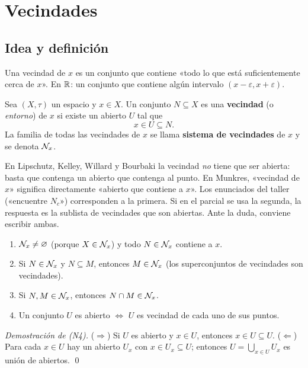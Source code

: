\section{Vecindades}
\subsection{Idea y definición}
Una vecindad de $x$ es un conjunto que contiene «todo lo que está suficientemente cerca de $x$». En $\mathbb{R}$: un conjunto
que contiene algún intervalo $(x-\varepsilon,x+\varepsilon)$.
\begin{definicion}
Sea $(X,\tau)$ un espacio y $x\in X$. Un conjunto $N\subseteq X$ es una \textbf{vecindad} (o \emph{entorno}) de $x$ si
existe un abierto $U$ tal que
\[x\in U\subseteq N.\]
La familia de todas las vecindades de $x$ se llama \textbf{sistema de vecindades} de $x$ y se denota $\mathcal{N}_x$.
\end{definicion}
\begin{ojo}
En Lipschutz, Kelley, Willard y Bourbaki la vecindad \emph{no} tiene que ser abierta: basta que
contenga un abierto que contenga al punto. En Munkres, «vecindad de $x$» significa directamente «abierto que
contiene a $x$». Los enunciados del taller («encuentre $N_c$») corresponden a la primera. Si en el parcial se usa la
segunda, la respuesta es la sublista de vecindades que son abiertas. Ante la duda, conviene escribir ambas.
\end{ojo}

\begin{teorema}
\begin{enumerate}[label=(N\arabic*),leftmargin=2.6em]
\item $\mathcal{N}_x\neq\varnothing$ (porque $X\in\mathcal{N}_x$) y todo $N\in\mathcal{N}_x$ contiene a $x$.
\item Si $N\in\mathcal{N}_x$ y $N\subseteq M$, entonces $M\in\mathcal{N}_x$ (los superconjuntos de vecindades son vecindades).
\item Si $N,M\in\mathcal{N}_x$, entonces $N\cap M\in\mathcal{N}_x$.
\item Un conjunto $U$ es abierto $\iff$ $U$ es vecindad de cada uno de sus puntos.
\end{enumerate}
\end{teorema}
\emph{Demostración de (N4).} ($\Rightarrow$) Si $U$ es abierto y $x\in U$, entonces $x\in U\subseteq U$. ($\Leftarrow$)
Para cada $x\in U$ hay un abierto $U_x$ con $x\in U_x\subseteq U$; entonces $U=\bigcup_{x\in U}U_x$ es unión de
abiertos. \qed

